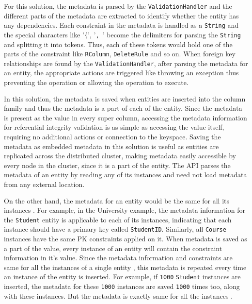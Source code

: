 	For this solution,  the metadata is
	parsed by the \texttt{ValidationHandler} and  the different parts of the
	metadata are extracted to identify whether the entity has any dependencies.   
	Each constraint in the metadata is handled as a
	\texttt{String} and the special characters like '\texttt{\{}',  '\texttt{, }'
	become the delimiters for parsing the \texttt{String} and splitting it into tokens.  
	Thus,  each of these tokens
	would hold one of the parts of the constraint like \texttt{RColumn}, 
	\texttt{DeleteRule} and so on. 
	When foreign key relationships are found by the
	\texttt{ValidationHandler}, after parsing the metadata for an entity,  the
	appropriate actions are triggered like throwing an exception thus preventing the operation 
	or allowing the operation to execute. 
	
	In this solution, the metadata is saved  when entities are inserted into the
	column family and thus the metadata is a part of each of the entity.  Since the
	metadata is present as the value in every super column,  accessing the metadata
	information for referential integrity validation is as simple as accessing the
	value itself,  requiring no additional actions or connection to the
	keyspace. Saving the metadata as embedded metadata in this solution is useful
	as entities are replicated across the distributed cluster, making metadata
	easily accessible by every node in the cluster, since it is a part of the
	entity.
	The \ac{API} parses the metadata of an entity by reading any of its instances
	and need not load metadata from any external location.
	
	On the other hand,  the metadata for an entity would be the same for all its
	instances .  For example,  in the University example,  the metadata
	information for the \texttt{Student} entity is applicable to each of its
	instances,  indicating that each instance  should have a primary key called
	\texttt{StudentID}. 
	Similarly,  all \texttt{Course} instances have the same \ac{PK} constraints
	applied on it.  When metadata is saved as a part of the  value, 
	every instance of an entity will contain the constraint information
	in it's value.  Since the metadata information and constraints are same for all
	the instances of a single entity ,  this metadata is repeated every time an
	instance of the entity is inserted.  For example,  if 
	\texttt{1000} \texttt{Student} instances are inserted,  the metadata for these
	\texttt{1000} instances are saved \texttt{1000} times too, along with these
	instances.  But the metadata is exactly same for all the
	instances . 
	

